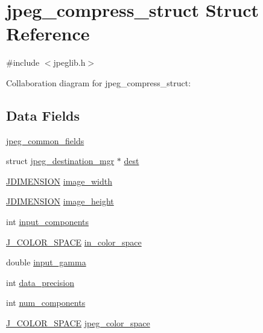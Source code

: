 \hypertarget{structjpeg__compress__struct}{}\section{jpeg\+\_\+compress\+\_\+struct Struct Reference}
\label{structjpeg__compress__struct}


{\ttfamily \#include $<$jpeglib.\+h$>$}



Collaboration diagram for jpeg\+\_\+compress\+\_\+struct\+:
\subsection*{Data Fields}
\begin{DoxyCompactItemize}
\item 
\hyperlink{structjpeg__compress__struct_a831013770bec36f77dd2048c8771513c}{jpeg\+\_\+common\+\_\+fields}
\item 
struct \hyperlink{structjpeg__destination__mgr}{jpeg\+\_\+destination\+\_\+mgr} $\ast$ \hyperlink{structjpeg__compress__struct_ab31c2c756e309dee8d0318557353ba40}{dest}
\item 
\hyperlink{jmorecfg_8h_a04ed4674f6f1d0d50ec241531e38274f}{J\+D\+I\+M\+E\+N\+S\+I\+ON} \hyperlink{structjpeg__compress__struct_ac8e50a2c70252c53f3e10b886818f2cf}{image\+\_\+width}
\item 
\hyperlink{jmorecfg_8h_a04ed4674f6f1d0d50ec241531e38274f}{J\+D\+I\+M\+E\+N\+S\+I\+ON} \hyperlink{structjpeg__compress__struct_a30863835e7785b7df800811f842b2da0}{image\+\_\+height}
\item 
int \hyperlink{structjpeg__compress__struct_af5b66b039ea5a96bb2f5cf0254115837}{input\+\_\+components}
\item 
\hyperlink{jpeglib_8h_a6ea40239360b06efe6377f125f1134f3}{J\+\_\+\+C\+O\+L\+O\+R\+\_\+\+S\+P\+A\+CE} \hyperlink{structjpeg__compress__struct_ac27d1dfbbbd677aab9fb570c58ca960d}{in\+\_\+color\+\_\+space}
\item 
double \hyperlink{structjpeg__compress__struct_ac5d2e16382ea12fb4e3bd6a69f7831ea}{input\+\_\+gamma}
\item 
int \hyperlink{structjpeg__compress__struct_a64c5b59e436f7d3d1d38b58d49993469}{data\+\_\+precision}
\item 
int \hyperlink{structjpeg__compress__struct_a524f0284a6fcf96b21c8a745282c15e2}{num\+\_\+components}
\item 
\hyperlink{jpeglib_8h_a6ea40239360b06efe6377f125f1134f3}{J\+\_\+\+C\+O\+L\+O\+R\+\_\+\+S\+P\+A\+CE} \hyperlink{structjpeg__compress__struct_a7fb5305ec135340eddc2ebabec6a84d7}{jpeg\+\_\+color\+\_\+space}

\end{DoxyCompactItemize}
